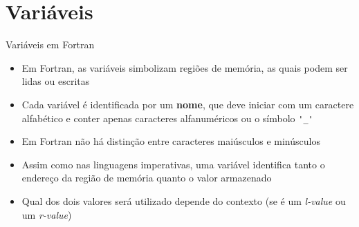 \section{Variáveis}

\begin{frame}[fragile]{Variáveis em Fortran}

    \begin{itemize}
        \item Em Fortran, as variáveis simbolizam regiões de memória, as quais podem ser 
            lidas ou escritas

        \item Cada variável é identificada por um \textbf{nome}, que deve iniciar com um
            caractere alfabético e conter apenas caracteres alfanuméricos ou o símbolo 
            \verb|'_'|

        \item Em Fortran não há distinção entre caracteres maiúsculos e minúsculos

        \item Assim como nas linguagens imperativas, uma variável identifica tanto o endereço
            da região de memória quanto o valor armazenado

        \item Qual dos dois valores será utilizado depende do contexto (se é um \textit{l-value} ou
            um \textit{r-value})

    \end{itemize}

\end{frame}

